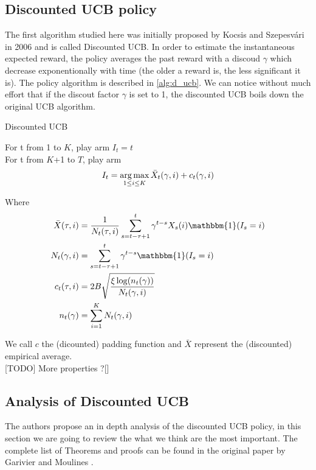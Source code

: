 \subsection{Discounted UCB policy}

The first algorithm studied here was initially proposed by Kocsis and Szepesvári in 2006 \cite{Kocsis06banditbased} and is called Discounted UCB. In order to estimate the instantaneous expected reward, the policy averages the past reward with a discoud $\gamma$ which decrease exponentionally with time (the older a reward is, the less significant it is).  The policy algorithm is described in \ref{alg:d_ucb}. We can notice without much effort that if the discout factor $\gamma$ is set to 1, the discounted UCB boils down the original UCB algorithm.\\

\begin{algorithm}[ht]
    \caption{Discounted UCB}
    \label{alg:d_ucb}
    For t from 1 to $K$, play arm $I_t = t$ \\
    For t from $K$+1 to $T$, play arm 
    $$ I_t = \operatorname*{arg\,max}_{1\leq i \leq K} \bar X_t(\gamma,i) + c_t(\gamma,i)$$
\end{algorithm}

Where
\begin{align}
\bar{X}(\tau, i) &= \frac{1}{N_t(\tau, i)}
\sum_{s=t-\tau+1}^t \gamma^{t-s}X_s(i)\mathbbm{1}(I_s=i)\\
N_t(\gamma, i) &= \sum_{s=t-\tau+1}^t \gamma^{t-s}\mathbbm{1}(I_s=i)\\
c_t(\tau, i) &= 2B\sqrt{\frac{\xi \log(n_t(\gamma))}{N_t(\gamma,i)}}\\
n_t(\gamma) &= \sum_{i=1}^K N_t(\gamma,i)
\end{align}

We call $c$ the (dicounted) padding function and $\bar X$ represent the (discounted) empirical average.\\

[TODO] More properties ?[]


\subsection{Analysis of Discounted UCB}

The authors propose an in depth analysis of the discounted UCB policy, in this section we are going to review the what we think are the most important. The complete list of Theorems and proofs can be found in the original paper by Garivier and Moulines \cite{garivier2008upperconfidence}.\\